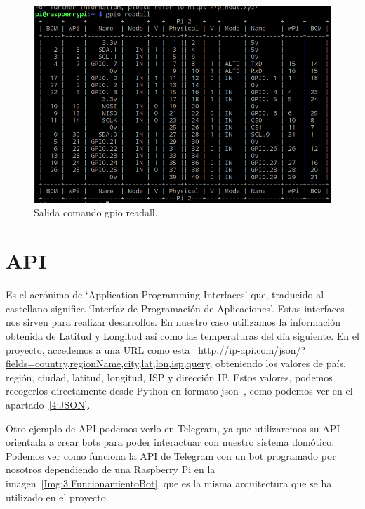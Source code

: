 \begin{figure}[h]
    \centering
    \includegraphics[width=.84\textwidth]{img/fotos/gpioReadall.png}
    \caption[Salida comando gpio readall]{Salida comando gpio readall.} \label{Img:3.GPIOReadAll}
\end{figure}


\section{API}\label{concepto:API}
Es el acrónimo de ‘Application Programming Interfaces’ que, traducido al castellano significa ‘Interfaz de Programación de Aplicaciones’. Estas interfaces nos sirven para realizar desarrollos. En nuestro caso utilizamos la información obtenida de Latitud y Longitud así como las temperaturas del día siguiente.
En el proyecto, accedemos a una URL como esta ~\url{http://ip-api.com/json/?fields=country,regionName,city,lat,lon,isp,query}, obteniendo los valores de país, región, ciudad, latitud, longitud, ISP y dirección IP.
Estos valores, podemos recogerlos directamente desde Python en formato json~\cite{misc:Json}, como podemos ver en el apartado~\ref{4:JSON}.

Otro ejemplo de API podemos verlo en Telegram, ya que utilizaremos su API orientada a crear bots para poder interactuar con nuestro sistema domótico. Podemos ver como funciona la API de Telegram con un bot programado por nosotros dependiendo de una Raspberry Pi en la imagen~\ref{Img:3.FuncionamientoBot}, que es la misma arquitectura que se ha utilizado en el proyecto.

